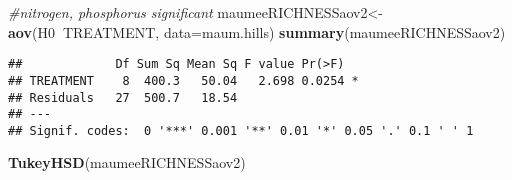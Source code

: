 \documentclass[]{article}
\newenvironment{Shaded}{\begin{snugshade}}{\end{snugshade}}
\newcommand{\KeywordTok}[1]{\textcolor[rgb]{0.13,0.29,0.53}{\textbf{#1}}}
\newcommand{\DataTypeTok}[1]{\textcolor[rgb]{0.13,0.29,0.53}{#1}}
\newcommand{\CommentTok}[1]{\textcolor[rgb]{0.56,0.35,0.01}{\textit{#1}}}
\newcommand{\OperatorTok}[1]{\textcolor[rgb]{0.81,0.36,0.00}{\textbf{#1}}}
\newcommand{\NormalTok}[1]{#1}
\begin{document}
\begin{Shaded}
\begin{Highlighting}[]
\CommentTok{#nitrogen, phosphorus significant}
\NormalTok{maumeeRICHNESSaov2<-}\KeywordTok{aov}\NormalTok{(H0}\OperatorTok{~}\NormalTok{TREATMENT, }\DataTypeTok{data=}\NormalTok{maum.hills)}
\KeywordTok{summary}\NormalTok{(maumeeRICHNESSaov2)}
\end{Highlighting}
\end{Shaded}

\begin{verbatim}
##             Df Sum Sq Mean Sq F value Pr(>F)  
## TREATMENT    8  400.3   50.04   2.698 0.0254 *
## Residuals   27  500.7   18.54                 
## ---
## Signif. codes:  0 '***' 0.001 '**' 0.01 '*' 0.05 '.' 0.1 ' ' 1
\end{verbatim}

\begin{Shaded}
\begin{Highlighting}[]
\KeywordTok{TukeyHSD}\NormalTok{(maumeeRICHNESSaov2)}
\end{Highlighting}
\end{Shaded}
\end{document}
